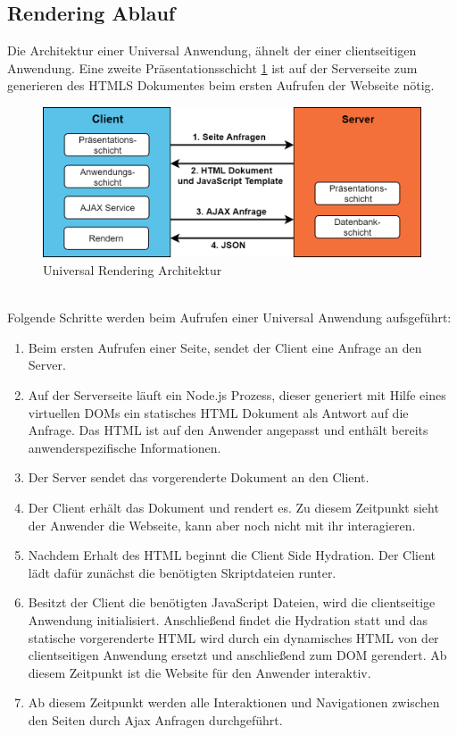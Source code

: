 \documentclass[runningheads]{llncs}
\begin{document}
\subsection{Rendering Ablauf}
\label{subsec:Rendering Ablauf}
Die Architektur einer Universal Anwendung, ähnelt der einer clientseitigen Anwendung. Eine
zweite Präsentationsschicht \ref{Universal Rendering Architektur} ist auf der Serverseite zum generieren des HTMLS Dokumentes beim
ersten Aufrufen der Webseite nötig.
\begin{figure}[h]
  \centering
  \includegraphics[width=12cm]{images/universal}
  \caption{Universal Rendering Architektur}
  \label{Universal Rendering Architektur}
\end{figure}
\\
Folgende Schritte werden beim Aufrufen einer Universal Anwendung aufsgeführt:
\begin{enumerate}
  \setlength\itemsep{1em}
  \item Beim ersten Aufrufen einer Seite, sendet der Client eine Anfrage an den Server.
  \item Auf der Serverseite läuft ein Node.js Prozess, 
  dieser generiert mit Hilfe eines virtuellen DOMs 
  ein statisches HTML Dokument als Antwort auf die Anfrage. 
  Das HTML ist auf den Anwender angepasst und enthält bereits anwenderspezifische Informationen.
  \item Der Server sendet das vorgerenderte Dokument an den Client.
  \item Der Client erhält das Dokument und rendert es. 
  Zu diesem Zeitpunkt sieht der Anwender die Webseite, 
  kann aber noch nicht mit ihr interagieren.
  \item Nachdem Erhalt des HTML beginnt die Client Side Hydration. 
  Der Client lädt dafür zunächst die benötigten Skriptdateien runter.
  \item Besitzt der Client die benötigten JavaScript Dateien, 
  wird die clientseitige Anwendung initialisiert. 
  Anschließend findet die Hydration statt und 
  das statische vorgerenderte HTML wird 
  durch ein dynamisches HTML von der clientseitigen Anwendung ersetzt und 
  anschließend zum DOM gerendert. 
  Ab diesem Zeitpunkt ist die Website für den Anwender interaktiv.
  \item Ab diesem Zeitpunkt werden alle Interaktionen und 
  Navigationen zwischen den Seiten durch Ajax Anfragen durchgeführt.
\end{enumerate}
\end{document}
